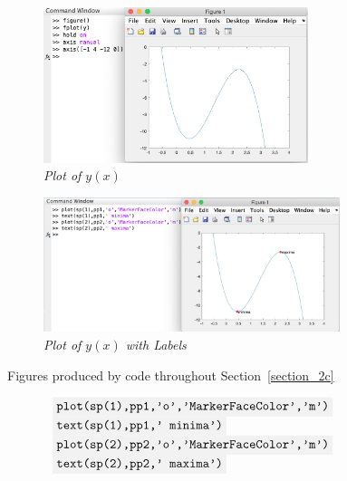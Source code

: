 \documentclass[10pt,a4paper]{article}
\newcommand{\code}[1]{\colorbox{light-gray}{\texttt{#1}}}
\begin{document}
	\begin{figure}[h!]
	\begin{subfigure}{0.5\textwidth}
		\begin{center}
			\includegraphics[width=0.85\textwidth]{c_screenshot.png}
		\end{center}
		\caption{\label{fig:plotofy}\textit{Plot of $y(x)$}}
	\end{subfigure}
	\begin{subfigure}{0.5\textwidth}
		\begin{center}
			\includegraphics[width=0.95\textwidth]{c_screenshot2.png}
		\end{center}
		\caption{\textit{\label{fig_plot2}Plot of $y(x)$ with Labels}}
	\end{subfigure}
	\caption{Figures produced by code throughout Section~\ref{section_2c}}
	\end{figure}
	
	\begin{equation} %
	\label{code:markers}
	\begin{array}{ll}
		\code{plot(sp(1),pp1,'o','MarkerFaceColor','m')}& \\
		\code{text(sp(1),pp1,' minima')} & \\
		\code{plot(sp(2),pp2,'o','MarkerFaceColor','m')} & \\
		\code{text(sp(2),pp2,' maxima')}
	\end{array}
	\end{equation}
\end{document}
